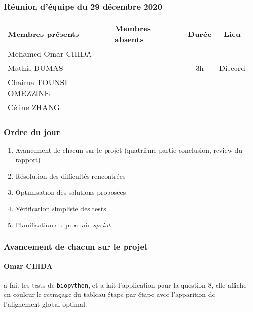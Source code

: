 


% 
\subsubsection*{\large{Réunion d'équipe du 29 décembre 2020}}
\begin{center}
\begin{tabular}{| l | l || c | c |}
    \hline
    Membres présents & Membres absents & Durée & Lieu \\
    \hline
    Mohamed-Omar CHIDA & & & \\ Mathis DUMAS & & 3h & Discord \\ Chaima TOUNSI OMEZZINE & & & \\ Céline ZHANG & & & \\
    \hline
\end{tabular}
\end{center}

\subsubsection*{Ordre du jour}
\begin{enumerate}
    \item Avancement de chacun sur le projet (quatrième partie conclusion, review du rapport)
    \item Résolution des difficultés rencontrées
    \item Optimisation des solutions proposées
    \item Vérification simpliste des tests
    \item Planification du prochain \textsl{sprint}
\end{enumerate}

\subsubsection*{Avancement de chacun sur le projet}
\paragraph*{Omar CHIDA} a fait les tests de \texttt{biopython}, et a fait l'application pour la question 8, elle affiche en couleur le retraçage du tableau étape par étape avec l'apparition de l'alignement global optimal.

